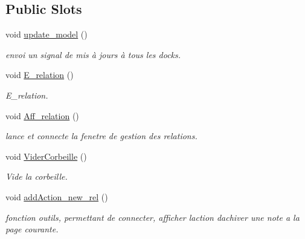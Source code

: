 \subsection*{Public Slots}
\begin{DoxyCompactItemize}
\item 
\mbox{\label{classinterface_ac23ab5d301d541fecb1c92e214935fd1}} 
void \hyperlink{classinterface_ac23ab5d301d541fecb1c92e214935fd1}{update\+\_\+model} ()
\begin{DoxyCompactList}\small\item\em envoi un signal de mis à jours à tous les docks. \end{DoxyCompactList}\item 
\mbox{\label{classinterface_a65202c3659f8058ab91b3b01cf8f267f}} 
void \hyperlink{classinterface_a65202c3659f8058ab91b3b01cf8f267f}{E\+\_\+relation} ()
\begin{DoxyCompactList}\small\item\em E\+\_\+relation. \end{DoxyCompactList}\item 
void \hyperlink{classinterface_a287c8a46ece12a94540a190b96b911c9}{Aff\+\_\+relation} ()
\begin{DoxyCompactList}\small\item\em lance et connecte la fenetre de gestion des relations. \end{DoxyCompactList}\item 
void \hyperlink{classinterface_a430ee153cb2ea74b9103081d48cd61f3}{Vider\+Corbeille} ()
\begin{DoxyCompactList}\small\item\em Vide la corbeille. \end{DoxyCompactList}\item 
\mbox{\label{classinterface_afda8f97b198f7d434cb1eb2d845dfefc}} 
void \hyperlink{classinterface_afda8f97b198f7d434cb1eb2d845dfefc}{add\+Action\+\_\+new\+\_\+rel} ()
\begin{DoxyCompactList}\small\item\em fonction outils, permettant de connecter, afficher l\textquotesingle{}action d\textquotesingle{}achiver une note a la page courante. \end{DoxyCompactList}\item 
\mbox{\label{classinterface_af42d8f6426ad19ce13f1dd2ce9f519c1}} 

\end{DoxyCompactItemize}
